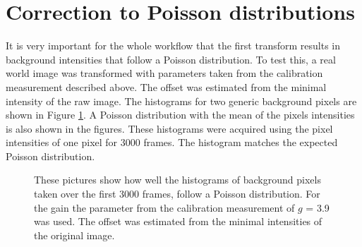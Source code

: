 \section{Correction to Poisson distributions}
It is very important for the whole workflow that the first transform results in background intensities that follow a Poisson distribution. To test this, a real world image was transformed with parameters taken from the calibration measurement described above. The offset was estimated from the minimal intensity of the raw image. The histograms for two generic background pixels are shown in Figure \ref{isitPoisson}. A Poisson distribution with the mean of the pixels intensities is also shown in the figures. These histograms were acquired using the pixel intensities of one pixel for 3000 frames. The histogram matches the expected Poisson distribution.
\begin{figure}
\hfill
{}
	\caption{These pictures show how well the histograms of background pixels taken over the first 3000 frames, follow a Poisson distribution. For the gain the parameter from the calibration measurement of $g$ = 3.9 was used. The offset was estimated from the minimal intensities of the original image.}
	\label{isitPoisson}	
\end{figure}

